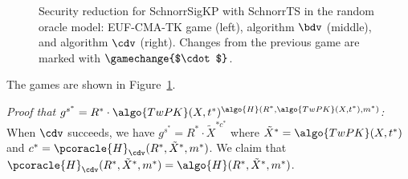 \begin{mysolution}
\begin{figure}[htbp]
\begin{center}
\begin{tcolorbox}[width=\textwidth]
\begin{pchstack}[center]
\begin{pcvstack}
{            }
            \pcvspace
            \pcvspace
          \end{pcvstack}
        \end{pchstack}
      \end{tcolorbox}
    \end{center}
    \caption{Security reduction for SchnorrSigKP with SchnorrTS in the random oracle model: EUF-CMA-TK game (left), algorithm $\bdv$ (middle), and algorithm $\cdv$ (right). Changes from the previous game are marked with $\gamechange{$\cdot$}$.}
    \label{fig:schnorrkp-reduction}
  \end{figure}
  
  The games are shown in Figure~\ref{fig:schnorrkp-reduction}.
  
  \emph{Proof that $g^{s^*} = R^* \cdot \algo{TwPK}(X, t^*)^{\algo{H}(R^*, \algo{TwPK}(X, t^*), m^*)}$:} 
  When $\cdv$ succeeds, we have $g^{s^*} = R^* \cdot \tilde{X}^{*c^*}$ where $\tilde{X}^* = \algo{TwPK}(X, t^*)$ and $c^* = \pcoracle{H}_{\cdv}(R^*, \tilde{X}^*, m^*)$.
  We claim that $\pcoracle{H}_{\cdv}(R^*, \tilde{X}^*, m^*) = \algo{H}(R^*, \tilde{X}^*, m^*)$.
  

\end{mysolution}
